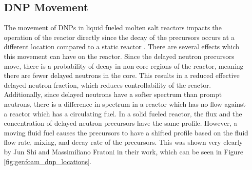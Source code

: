 

\subsection{DNP Movement}

The movement of DNPs in liquid fueled molten salt reactors impacts the operation of the reactor directly since the decay of the precursors occurs at a different location compared to a static reactor \cite{wooten_review_2018, aufiero_calculating_2014}. There are several effects which this movement can have on the reactor. Since the delayed neutron precursors move, there is a probability of decay in non-core regions of the reactor, meaning there are fewer delayed neutrons in the core. This results in a reduced effective delayed neutron fraction, which reduces controllability of the reactor. Additionally, since delayed neutrons have a softer spectrum than prompt neutrons, there is a difference in spectrum in a reactor which has no flow against a reactor which has a circulating fuel.
In a solid fueled reactor, the flux and the concentration of delayed neutron precursors have the same profile. However, a moving fluid fuel causes the precursors to have a shifted profile based on the fluid flow rate, mixing, and decay rate of the precursors. This was shown very clearly by Jun Shi and Massimiliano Fratoni in their work, which can be seen in Figure \ref{fig:genfoam_dnp_locations}.

